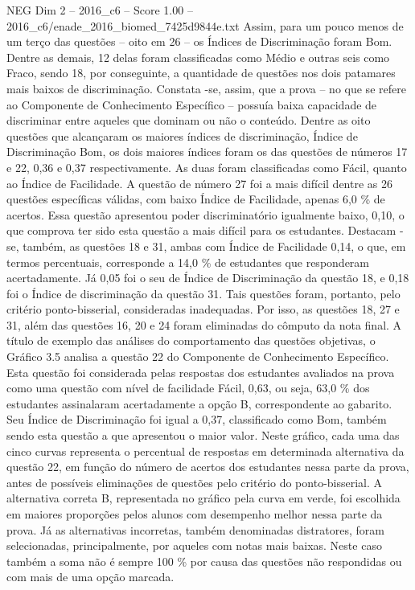 \begin{textsample}{NEG Dim 2 – 2016\_c6 – Score 1.00 – 2016\_c6/enade\_2016\_biomed\_7425d9844e.txt}
Assim, para um pouco menos de um terço das questões – oito em 26 – os Índices de Discriminação foram Bom.
Dentre as demais, 12 delas foram classificadas como Médio e outras seis como Fraco, sendo 18, por conseguinte, a quantidade de questões nos dois patamares mais baixos de discriminação.
Constata -se, assim, que a prova – no que se refere ao Componente de Conhecimento Específico – possuía baixa capacidade de discriminar entre aqueles que dominam ou não o conteúdo.
Dentre as oito questões que alcançaram os maiores índices de discriminação, Índice de Discriminação Bom, os dois maiores índices foram os das questões de números 17 e 22, 0,36 e 0,37 respectivamente.
As duas foram classificadas como Fácil, quanto ao Índice de Facilidade.
A questão de número 27 foi a mais difícil dentre as 26 questões específicas válidas, com baixo Índice de Facilidade, apenas 6,0 \% de acertos.
Essa questão apresentou poder discriminatório igualmente baixo, 0,10, o que comprova ter sido esta questão a mais difícil para os estudantes.
Destacam -se, também, as questões 18 e 31, ambas com Índice de Facilidade 0,14, o que, em termos percentuais, corresponde a 14,0 \% de estudantes que responderam acertadamente.
Já 0,05 foi o seu de Índice de Discriminação da questão 18, e 0,18 foi o Índice de discriminação da questão 31.
Tais questões foram, portanto, pelo critério ponto-bisserial, consideradas inadequadas.
Por isso, as questões 18, 27 e 31, além das questões 16, 20 e 24 foram eliminadas do cômputo da nota final.
A título de exemplo das análises do comportamento das questões objetivas, o Gráfico 3.5 analisa a questão 22 do Componente de Conhecimento Específico.
Esta questão foi considerada pelas respostas dos estudantes avaliados na prova como uma questão com nível de facilidade Fácil, 0,63, ou seja, 63,0 \% dos estudantes assinalaram acertadamente a opção B, correspondente ao gabarito.
Seu Índice de Discriminação foi igual a 0,37, classificado como Bom, também sendo esta questão a que apresentou o maior valor.
Neste gráfico, cada uma das cinco curvas representa o percentual de respostas em determinada alternativa da questão 22, em função do número de acertos dos estudantes nessa parte da prova, antes de possíveis eliminações de questões pelo critério do ponto-bisserial.
A alternativa correta B, representada no gráfico pela curva em verde, foi escolhida em maiores proporções pelos alunos com desempenho melhor nessa parte da prova.
Já as alternativas incorretas, também denominadas distratores, foram selecionadas, principalmente, por aqueles com notas mais baixas.
Neste caso também a soma não é sempre 100 \% por causa das questões não respondidas ou com mais de uma opção marcada.

\end{textsample}
